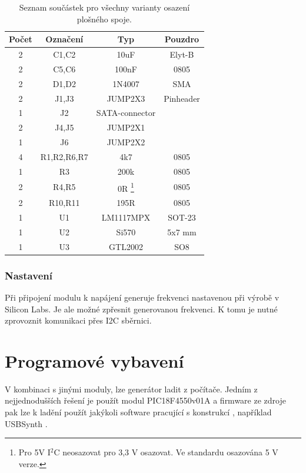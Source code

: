 \documentclass[12pt,a4paper,oneside]{article}
\begin{document}
\begin{savenotes}
\begin{table}[h!]
\begin{center}
\begin{tabular}{ |c|c|c|c| }
\hline 
Počet & Označení & Typ  & Pouzdro  \\ 
\hline 
2 & C1,C2 & 10uF & Elyt-B \\
2 &	C5,C6 & 100nF & 0805 \\
2 &	D1,D2 & 1N4007 & SMA \\
2 & J1,J3 & JUMP2X3 & Pinheader \\
1 &	J2 & SATA-connector & \\ 
2 &	J4,J5 & JUMP2X1 & \\
1 &	J6 & JUMP2X2 & \\
4 & R1,R2,R6,R7 & 4k7 & 0805 \\
1 &	R3 & 200k & 0805 \\
2 &	R4,R5 & 0R \footnote{ Pro 5V I$^2$C neosazovat pro 3,3 V osazovat. Ve standardu osazována 5 V verze.} & 0805\\
2 &	R10,R11 & 195R & 0805 \\
1 &	U1 & LM1117MPX & SOT-23 \\
1 & U2 & Si570 & 5x7 mm \\
1 &	U3 & GTL2002 & SO8 \\
\hline 
\end{tabular}
\end{center}
\caption{Seznam součástek pro všechny varianty osazení plošného spoje.}
\label{seznam_soucastek}
\end{table}
\end{savenotes}

\newpage

\subsubsection{Nastavení}
Při připojení modulu k napájení generuje frekvenci nastavenou při výrobě v Silicon Labs. Je ale možné zpřesnit generovanou frekvenci. K tomu je nutné zprovoznit komunikaci přes I2C sběrnici. 

\section{Programové vybavení}
V kombinaci s jinými moduly, lze generátor ladit z počítače. Jedním z nejjednodušších řešení je použít modul PIC18F4550v01A a firmware ze zdroje \cite{DG8SAQemulator} pak lze k ladění použít jakýkoli software pracující s konstrukcí \cite{DG8SAQSynthesizer}, například USBSynth \cite{USB_Synth}.
\end{document}
